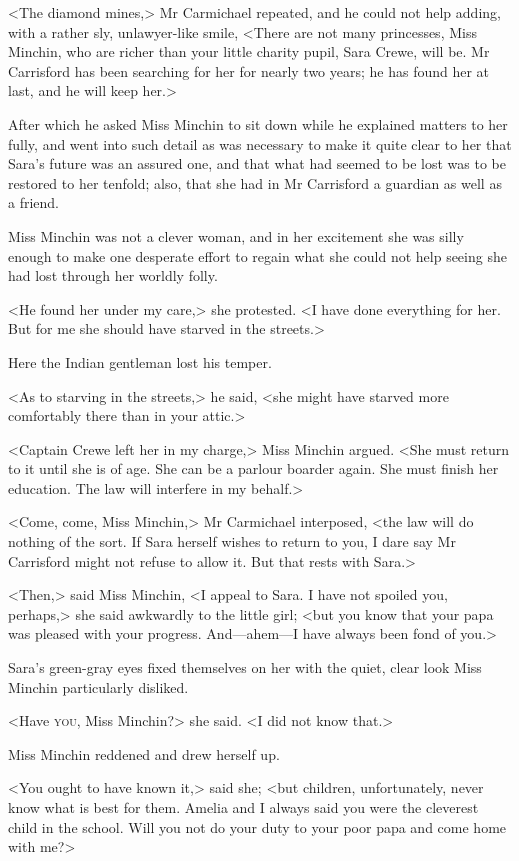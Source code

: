 <The diamond mines,> Mr Carmichael repeated, and he could not help adding, with a rather sly, unlawyer-like smile, <There are not many princesses, Miss Minchin, who are richer than your little charity pupil, Sara Crewe, will be. Mr Carrisford has been searching for her for nearly two years; he has found her at last, and he will keep her.>

After which he asked Miss Minchin to sit down while he explained matters to her fully, and went into such detail as was necessary to make it quite clear to her that Sara's future was an assured one, and that what had seemed to be lost was to be restored to her tenfold; also, that she had in Mr Carrisford a guardian as well as a friend.

Miss Minchin was not a clever woman, and in her excitement she was silly enough to make one desperate effort to regain what she could not help seeing she had lost through her worldly folly.

<He found her under my care,> she protested. <I have done everything for her. But for me she should have starved in the streets.>

Here the Indian gentleman lost his temper.

<As to starving in the streets,> he said, <she might have starved more comfortably there than in your attic.>

<Captain Crewe left her in my charge,> Miss Minchin argued. <She must return to it until she is of age. She can be a parlour boarder again. She must finish her education. The law will interfere in my behalf.>

<Come, come, Miss Minchin,> Mr Carmichael interposed, <the law will do nothing of the sort. If Sara herself wishes to return to you, I dare say Mr Carrisford might not refuse to allow it. But that rests with Sara.>

<Then,> said Miss Minchin, <I appeal to Sara. I have not spoiled you, perhaps,> she said awkwardly to the little girl; <but you know that your papa was pleased with your progress. And—ahem—I have always been fond of you.>

Sara's green-gray eyes fixed themselves on her with the quiet, clear look Miss Minchin particularly disliked.

<Have \textsc{you}, Miss Minchin?> she said. <I did not know that.>

Miss Minchin reddened and drew herself up.

<You ought to have known it,> said she; <but children, unfortunately, never know what is best for them. Amelia and I always said you were the cleverest child in the school. Will you not do your duty to your poor papa and come home with me?>

